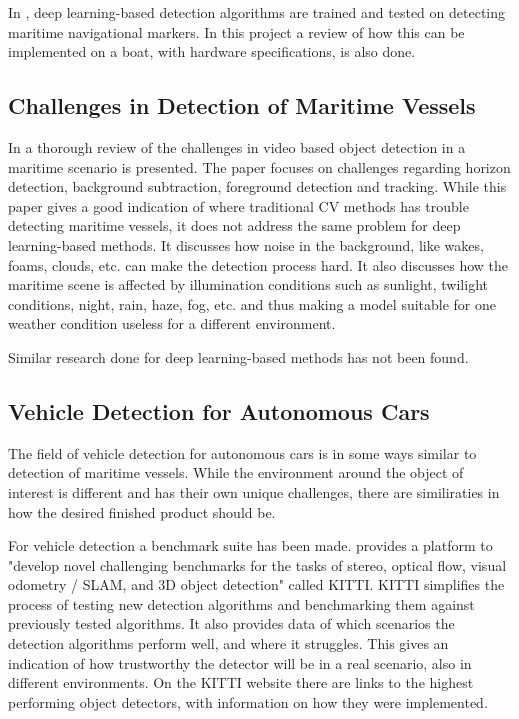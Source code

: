 \vspace{3mm}

In \citep{Goring2017}, deep learning-based detection algorithms are trained and tested on detecting maritime navigational markers. In this project a review of how this can be implemented on a boat, with hardware specifications, is also done. 


\subsection{Challenges in Detection of Maritime Vessels}

In \citep{Challenges2016} a thorough review of the challenges in video based object detection in a maritime scenario is presented. The paper focuses on challenges regarding horizon detection, background subtraction, foreground detection and tracking. While this paper gives a good indication of where traditional CV methods has trouble detecting maritime vessels, it does not address the same problem for deep learning-based methods. It discusses how noise in the background, like wakes, foams, clouds, etc. can make the detection process hard. It also discusses how the maritime scene is affected by illumination conditions such as sunlight, twilight conditions, night, rain, haze, fog, etc. and thus making a model suitable for one weather condition useless for a different environment.

\vspace{3mm}

Similar research done for deep learning-based methods has not been found.




\subsection{Vehicle Detection for Autonomous Cars}

The field of vehicle detection for autonomous cars is in some ways similar to detection of maritime vessels. While the environment around the object of interest is different and has their own unique challenges, there are similiraties in how the desired finished product should be. 

\vspace{3mm}

For vehicle detection a benchmark suite has been made. \citep{KITTI} provides a platform to "develop novel challenging benchmarks for the tasks of stereo, optical flow, visual odometry / SLAM, and 3D object detection" called KITTI. KITTI simplifies the process of testing new detection algorithms and benchmarking them against previously tested algorithms. It also provides data of which scenarios the detection algorithms perform well, and where it struggles. This gives an indication of how trustworthy the detector will be in a real scenario, also in different environments. On the KITTI website there are links to the highest performing object detectors, with information on how they were implemented.


